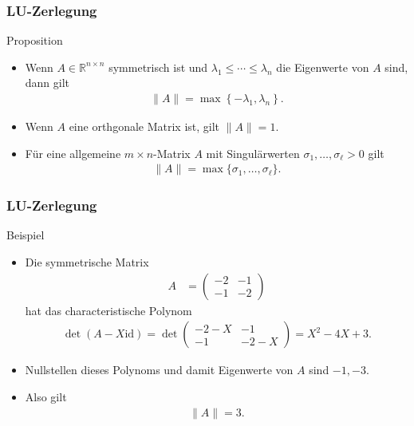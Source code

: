 \documentclass{beamer}
\newcommand\RR{\mathbb R}
\newcommand{\id}{\mathrm{id}}
\newcommand\cbc[1]{\left\{{#1}\right\}}
\renewcommand{\ae}{\"a}
\newcommand{\ue}{\"u}
\newcommand{\mytitle}{LU-Zerlegung}
\begin{document}
\begin{frame}\frametitle{\mytitle}
	\begin{block}{Proposition}
		\begin{itemize}
			\item Wenn $A\in\RR^{n\times n}$ symmetrisch ist und $\lambda_1\leq\cdots\leq\lambda_n$ die Eigenwerte von $A$ sind, dann gilt
				\begin{align*}
					\|A\|=\max\cbc{-\lambda_1,\lambda_n}.
				\end{align*}
			\item Wenn $A$ eine orthgonale Matrix ist, gilt $\|A\|=1$.
			\item F\ue r eine allgemeine $m\times n$-Matrix $A$ mit Singul\ae rwerten $\sigma_1,\ldots,\sigma_\ell>0$ gilt
				\begin{align*}
					\|A\|=\max\{\sigma_1,\ldots,\sigma_\ell\}.
				\end{align*}
		\end{itemize}
	\end{block}
\end{frame}

\begin{frame}\frametitle{\mytitle}
	\begin{block}{Beispiel}
		\begin{itemize}
			\item Die symmetrische Matrix
				\begin{align*}
					A&=\begin{pmatrix} -2&-1\\-1&-2 \end{pmatrix}
				\end{align*}
				hat das characteristische Polynom
				\begin{align*}
					\det(A-X\id)=\det\begin{pmatrix} -2-X&-1\\-1&-2-X \end{pmatrix}=X^2-4X+3.
				\end{align*}
			\item Nullstellen dieses Polynoms und damit Eigenwerte von $A$ sind $-1,-3$.
			\item Also gilt
				\begin{align*}
				\|A\|=3.
				\end{align*}
		\end{itemize}
	\end{block}
\end{frame}
\end{document}
